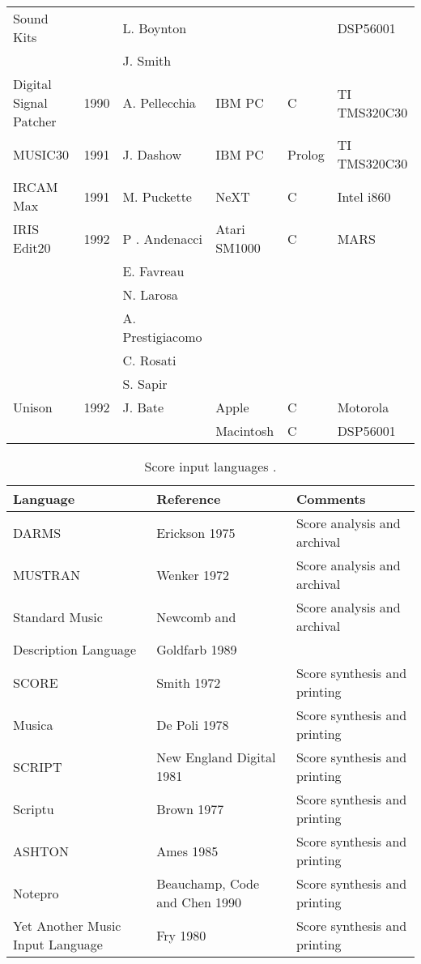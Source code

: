 \begin{table}[htbp]
\begin{tabular}{ *{6}{l} }
		Sound Kits & & L. Boynton & & & DSP56001 \\
		& & J. Smith & & & \\
		Digital Signal Patcher & 1990 & A. Pellecchia & IBM PC & C & TI TMS320C30 \\
		MUSIC30 & 1991 & J. Dashow & IBM PC & Prolog & TI TMS320C30 \\
		IRCAM Max & 1991 & M. Puckette & NeXT & C & Intel i860 \\
		IRIS Edit20 & 1992 & P . Andenacci & Atari SM1000 & C & MARS \\
		& & E. Favreau & & & \\
		& & N. Larosa & & & \\
		& & A. Prestigiacomo & & & \\
		& & C. Rosati & & & \\
		& & S. Sapir & & & \\
		Unison & 1992 & J. Bate & Apple & C & Motorola \\
		& & & Macintosh & C & DSP56001 \\
		\hline
	\end{tabular}
\end{table}

\begin{table}[htbp]
	\caption{Score input languages \cite[811]{Roads1995}.}
	\centering
	\vspace{12pt}
	\begin{tabular}{ *{3}{l} }
		\hline
		Language & Reference & Comments \\
		\hline
		DARMS & Erickson 1975 & Score analysis and archival \\
		MUSTRAN & Wenker 1972 & Score analysis and archival \\
		Standard Music & Newcomb and & Score analysis and archival \\
		Description Language & Goldfarb 1989 & \\
		SCORE & Smith 1972 & Score synthesis and printing \\
		Musica & De Poli 1978 & Score synthesis and printing \\
		SCRIPT & New England Digital 1981 & Score synthesis and printing \\
		Scriptu & Brown 1977 & Score synthesis and printing \\
		ASHTON & Ames 1985 & Score synthesis and printing \\
		Notepro & Beauchamp, Code and Chen 1990 & Score synthesis and printing \\
		Yet Another Music Input Language & Fry 1980 & Score synthesis and printing \\
		\hline
	\end{tabular}
\end{table}

